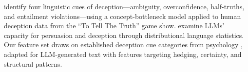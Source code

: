 \citet{hazra2024tell} identify four linguistic cues of deception---ambiguity, overconfidence, half-truths, and entailment violations---using a concept-bottleneck model applied to human deception data from the ``To Tell The Truth'' game show.
\citet{jones2024lies} examine LLMs' capacity for persuasion and deception through distributional language statistics.
Our feature set draws on established deception cue categories from psychology \citep{newman2003lying}, adapted for LLM-generated text with features targeting hedging, certainty, and structural patterns.
